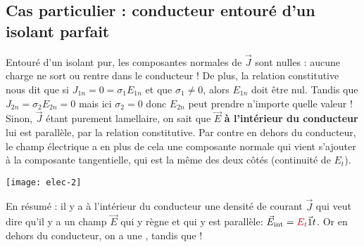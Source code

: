 \documentclass[12pt]{book}
\begin{document}

\subsection{Cas particulier : conducteur entouré d'un isolant parfait}
Entouré d'un isolant pur, les composantes normales de $\vec{J}$ sont nulles : aucune charge ne sort ou rentre dans le conducteur ! De plus, la relation constitutive nous dit que si $J_{1n} = 0 = \sigma_1 E_{1n}$ et que $\sigma_1 \neq 0$, alors $E_{1n}$ doit être nul. Tandis que $J_{2n} = \sigma_2 E_{2n} = 0$ mais ici $\sigma_2 = 0$ donc $E_{2n}$ peut prendre n'importe quelle valeur ! \\

Sinon, $\vec{J}$ étant purement lamellaire, on sait que $\vec{E}$ \textbf{à l'intérieur du conducteur} lui est parallèle, par la relation constitutive. Par contre en dehors du conducteur, le champ électrique a en plus de cela une composante normale qui vient s'ajouter à la composante tangentielle, qui est la même des deux côtés (continuité de $E_t$). 
\begin{center}
\texttt{[image: elec-2]}
\end{center}
En résumé : il y a à l'intérieur du conducteur une densité de courant $\vec{J}$ qui veut dire qu'il y a un champ $\vec{E}$ qui y règne et qui y est parallèle: $\vec{E}_{\text{int}} = \rouge{E_t} \vec{1}t$. Or en dehors du conducteur, on a une , tandis que  !
\end{document}
